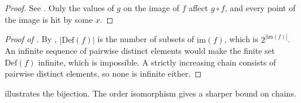 \documentclass[11pt]{article}
\theoremstyle{definition}
\newcommand{\Def}{\mathrm{Def}}
\newcommand{\im}{\mathrm{im}}
\newcommand{\1}{\mathbf{1}}
\begin{document}
\begin{proof}
See . Only the values of $g$ on the image of $f$ affect $g\circ f$, and every point of the image is hit by some $x$.
\end{proof}

\begin{proof}[Proof of ]
By , $|\Def(f)|$ is the number of subsets of $\im(f)$, which is $2^{|\im(f)|}$.
An infinite sequence of pairwise distinct elements would make the finite set $\Def(f)$ infinite, which is impossible.
A strictly increasing chain consists of pairwise distinct elements, so none is infinite either.
\end{proof}

 illustrates the bijection.
The order isomorphism gives a sharper bound on chains.
\end{document}
